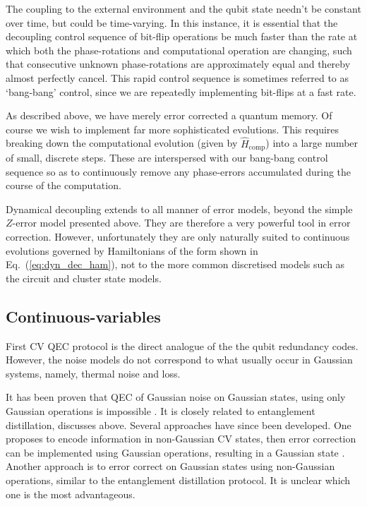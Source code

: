 The coupling to the external environment and the qubit state needn't be constant over time, but could be time-varying. In this instance, it is essential that the decoupling control sequence of bit-flip operations be much faster than the rate at which both the phase-rotations and computational operation are changing, such that consecutive unknown phase-rotations are approximately equal and thereby almost perfectly cancel. This rapid control sequence is sometimes referred to as `bang-bang' control, since we are repeatedly implementing bit-flips at a fast rate. 

As described above, we have merely error corrected a quantum memory. Of course we wish to implement far more sophisticated evolutions. This requires breaking down the computational evolution (given by $\hat{H}_\mathrm{comp}$) into a large number of small, discrete steps. These are interspersed with our bang-bang control sequence so as to continuously remove any phase-errors accumulated during the course of the computation.

Dynamical decoupling extends to all manner of error models, beyond the simple $Z$-error model presented above. They are therefore a very powerful tool in error correction. However, unfortunately they are only naturally suited to continuous evolutions governed by Hamiltonians of the form shown in Eq.~(\ref{eq:dyn_dec_ham}), not to the more common discretised models such as the circuit and cluster state models.


%
%

\subsection{Continuous-variables}

First CV QEC protocol is the direct analogue of the the qubit redundancy codes. However, the noise models do not correspond to what usually occur in Gaussian systems, namely, thermal noise and loss.

It has been proven that QEC of Gaussian noise on Gaussian states, using only Gaussian operations is impossible \cite{bib:PhysRevLett.102.120501}. It is closely related to entanglement distillation, discusses above. Several approaches have since been developed. One proposes to encode information in non-Gaussian CV states, then error correction can be implemented using Gaussian operations, resulting in a Gaussian state \cite{bib:pirandola2004constructing}. Another approach is to error correct on Gaussian states using non-Gaussian operations, similar to the entanglement distillation protocol. It is unclear which one is the most advantageous.

